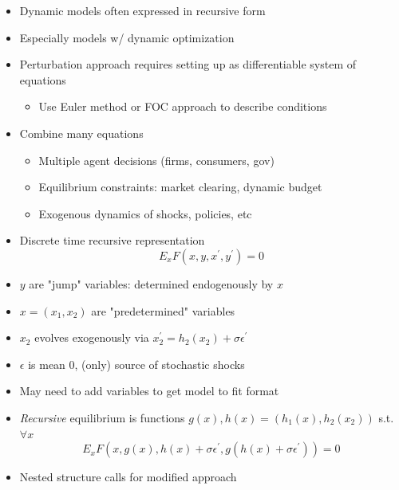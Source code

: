 \documentclass[bigger,handout]{beamer}
\begin{document}
\begin{frame}%
 

\begin{itemize}
\item Dynamic models often expressed in recursive form
\item Especially models w/ dynamic optimization
\item Perturbation approach requires setting up as differentiable system of equations
\begin{itemize}
\item Use Euler method or FOC approach to describe conditions
\end{itemize}
\item Combine many equations
\begin{itemize}
\item Multiple agent decisions (firms, consumers, gov)
\item Equilibrium constraints: market clearing, dynamic budget
\item Exogenous dynamics of shocks, policies, etc
\end{itemize}



\end{itemize}
\end{frame}%

\begin{frame}%
 

\begin{itemize}
\item Discrete time recursive representation
\begin{equation*}
E_x F(x,y,x^{\prime},y^{\prime})=0
\end{equation*}
\item $y$ are "jump" variables: determined endogenously by $x$
\item $x=(x_1,x_2)$ are "predetermined" variables
\item $x_2$ evolves exogenously via $x_2^{\prime}=h_2(x_2)+\sigma\epsilon^{\prime}$
\item $\epsilon$ is mean 0, (only) source of stochastic shocks
\item May need to add variables to get model to fit format
\item \emph{Recursive} equilibrium is functions $g(x),h(x)=(h_1(x),h_2(x_2))$ s.t. $\forall x$
\begin{equation*}
E_x F(x,g(x),h(x)+\sigma\epsilon^{\prime},g(h(x)+\sigma\epsilon^{\prime}))=0
\end{equation*}
\item Nested structure calls for modified approach
\end{itemize}

\end{frame}%
\end{document}
